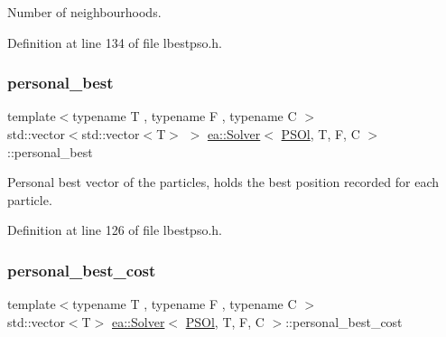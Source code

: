 Number of neighbourhoods. 



Definition at line 134 of file lbestpso.\+h.

\mbox{\label{classea_1_1_solver_3_01_p_s_ol_00_01_t_00_01_f_00_01_c_01_4_a0738e0ab079273c4d34c827fad533868}} 
\subsubsection{\texorpdfstring{personal\+\_\+best}{personal\_best}}
{\footnotesize\ttfamily template$<$typename T , typename F , typename C $>$ \\
std\+::vector$<$std\+::vector$<$T$>$ $>$ \hyperlink{classea_1_1_solver}{ea\+::\+Solver}$<$ \hyperlink{structea_1_1_p_s_ol}{P\+S\+Ol}, T, F, C $>$\+::personal\+\_\+best\hspace{0.3cm}{\ttfamily [private]}}



Personal best vector of the particles, holds the best position recorded for each particle. 



Definition at line 126 of file lbestpso.\+h.

\mbox{\label{classea_1_1_solver_3_01_p_s_ol_00_01_t_00_01_f_00_01_c_01_4_ae728d584641709062919b0cedd3e77cc}} 
\subsubsection{\texorpdfstring{personal\+\_\+best\+\_\+cost}{personal\_best\_cost}}
{\footnotesize\ttfamily template$<$typename T , typename F , typename C $>$ \\
std\+::vector$<$T$>$ \hyperlink{classea_1_1_solver}{ea\+::\+Solver}$<$ \hyperlink{structea_1_1_p_s_ol}{P\+S\+Ol}, T, F, C $>$\+::personal\+\_\+best\+\_\+cost\hspace{0.3cm}{\ttfamily [private]}}



